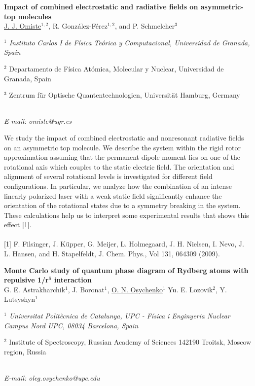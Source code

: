 \newpage
\setcounter{figure}{0}
\begin{center}
{\bf \Large
Impact of combined electrostatic and radiative fields on asymmetric-top molecules
}
\\
\vspace{0.5cm}
\underline{J. J. Omiste}$^{1,2}$, R. González-Férez$^{1,2}$, and P. Schmelcher$^{3}$
\\
\vspace{0.5cm}
{\it
$^{1}$ Instituto Carlos I de Física Teórica y Computacional, Universidad de Granada, Spain

$^{2}$ Departamento de Física Atómica, Molecular y Nuclear, Universidad de Granada, Spain

$^{3}$ Zentrum für Optische Quantentechnologien, Universität Hamburg, Germany
}
\\
\vspace{0.5cm}
{\it E-mail: omiste@ugr.es}
\\
\vspace{0.5cm}
\end{center}
We study the impact of combined electrostatic and nonresonant radiative fields on an asymmetric
top molecule. We describe the system within the rigid rotor approximation assuming that
the permanent dipole moment lies on one of the rotational axis which couples to the static electric field.
The orientation and alignment of several rotational levels is investigated for different field configurations.
In particular, we analyze how the combination of an intense linearly polarized laser with
a weak static field significantly enhance the orientation of the rotational states due to a symmetry breaking in the system.
These calculations help us to interpret some experimental results that
shows this effect [1].
\\
\vspace{0.5cm}
\\
{\footnotesize
[1] F. Filsinger, J. Küpper, G. Meijer, L. Holmegaard, J. H. Nielsen, I. Nevo, J. L. Hansen, and H. Stapelfeldt, J. Chem.
Phys., Vol 131, 064309 (2009).
}
\newpage
\setcounter{figure}{0}
\begin{center}
{\bf \Large
Monte Carlo study of quantum phase diagram of Rydberg atoms with
repulsive 1/r$^{6}$ interaction
}
\\
\vspace{0.5cm}
G. E. Astrakharchik$^{1}$, J. Boronat$^{1}$, \underline{O. N. Osychenko}$^{1}$
Yu. E. Lozovik$^{2}$, Y. Lutsyshyn$^{1}$
\\
\vspace{0.5cm}
{\it 
$^{1}$ Universitat Politècnica de Catalunya, UPC - Física i Enginyeria Nuclear
Campus Nord UPC, 08034 Barcelona, Spain

$^{2}$ Institute of Spectroscopy, Russian Academy of Sciences
142190 Troitsk, Moscow region, Russia
}
\\
\vspace{0.5cm}
{\it E-mail: oleg.osychenko@upc.edu}
\\
\vspace{0.5cm}
\end{center}
